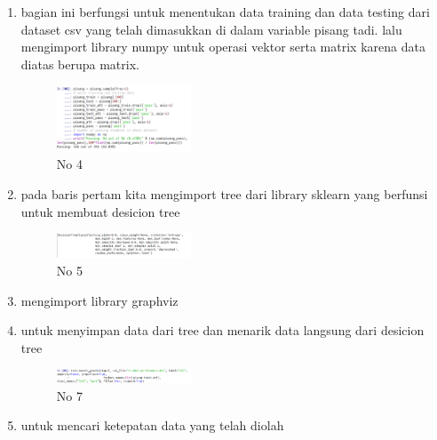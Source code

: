 \begin{enumerate}
            \item bagian ini berfungsi untuk menentukan data training dan data testing dari dataset csv yang telah dimasukkan di dalam variable pisang tadi. lalu mengimport library numpy untuk operasi vektor serta matrix karena data diatas berupa matrix.
            \hfill \break 
            \begin{figure}[H]
                \includegraphics[width=4cm]{figures/1174040/chapter2/4.png}
                \centering
                \caption{No 4}
            \end{figure}

            \item pada baris pertam kita mengimport tree dari library sklearn yang berfunsi untuk membuat desicion tree
            \hfill \break 
            \begin{figure}[H]
                \includegraphics[width=4cm]{figures/1174040/chapter2/5.png}
                \centering
                \caption{No 5}
            \end{figure}

            \item mengimport library graphviz
            \hfill \break 

            \item untuk menyimpan data dari tree dan menarik data langsung dari desicion tree
            \hfill \break 
            \begin{figure}[H]
                \includegraphics[width=4cm]{figures/1174040/chapter2/7.png}
                \centering
                \caption{No 7}
            \end{figure}

            \item untuk mencari ketepatan data yang telah diolah
            \hfill \break 


\end{enumerate}
